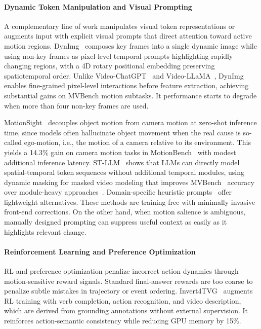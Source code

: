 \documentclass[10pt]{article} %
\begin{document}
\paragraph{Dynamic Token Manipulation and Visual Prompting}

A complementary line of work manipulates visual token representations or augments input with explicit visual prompts that direct attention toward active motion regions. DynImg~\citep{Bao2025DynImgKF} composes key frames into a single dynamic image while using non-key frames as pixel-level temporal prompts highlighting rapidly changing regions, with a 4D rotary positional embedding preserving spatiotemporal order. Unlike Video-ChatGPT~\citep{Maaz2023VideoChatGPTTD} and Video-LLaMA~\citep{Zhang2023VideoLLaMAAI}, DynImg enables fine-grained pixel-level interactions before feature extraction, achieving substantial gains on MVBench motion subtasks. It performance starts to degrade when more than four non-key frames are used.

MotionSight~\citep{Du2025MotionSightBF} decouples object motion from camera motion at zero-shot inference time, since models often hallucinate object movement when the real cause is so-called ego-motion, i.e., the motion of a camera relative to its environment. This yields a 14.3\% gain on camera motion tasks in MotionBench~\citep{Hong2025MotionBenchBA} with modest additional inference latency. ST-LLM~\citep{Liu2024STLLMLL} shows that LLMs can directly model spatial-temporal token sequences without additional temporal modules, using dynamic masking for masked video modeling that improves MVBench~\citep{li2024mvbench} accuracy over module-heavy approaches~\citep{Luo2023ValleyVA}. Domain-specific heuristic prompts~\citep{Yu2024PromptingVF} offer lightweight alternatives. These methods are training-free with minimally invasive front-end corrections. On the other hand, when motion salience is ambiguous, manually designed prompting can suppress useful context as easily as it highlights relevant change.

\paragraph{Reinforcement Learning and Preference Optimization}

RL and preference optimization penalize incorrect action dynamics through motion-sensitive reward signals. Standard final-answer rewards are too coarse to penalize subtle mistakes in trajectory or event ordering. Invert4TVG~\citep{Chen2025Invert4TVGAT} augments RL training with verb completion, action recognition, and video description, which are derived from grounding annotations without external supervision. It reinforces action-semantic consistency while reducing GPU memory by 15\%.
\end{document}
